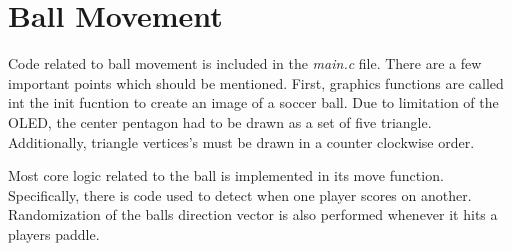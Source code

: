 \section{Ball Movement} 

Code related to ball movement is included in the \emph{main.c} file. 
There are a few important points which should be mentioned.
First, graphics functions are called int the init fucntion to create an image of a soccer ball.
Due to limitation of the OLED, the center pentagon had to be drawn as a set of five triangle.
Additionally, triangle vertices's must be drawn in a counter clockwise order.

Most core logic related to the ball is implemented in its move function.
Specifically, there is code used to detect when one player scores on another.
Randomization of the balls direction vector is also performed whenever it hits a players paddle.

